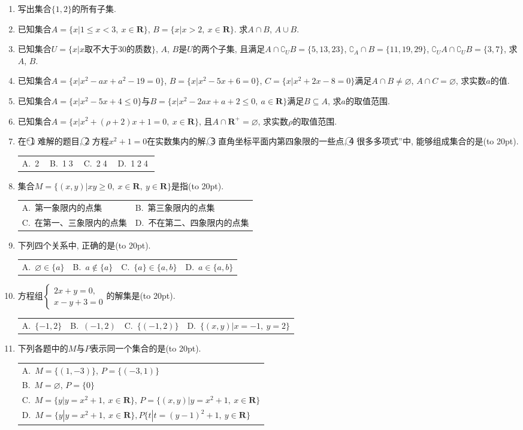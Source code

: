 \documentclass[10pt,a4paper]{article}
\newcommand{\bracket}[1]{(\hbox to #1pt{})}
\newcommand{\onech}[4]{\par\begin{tabular}{p{.9\textwidth}}
A.~#1\\
B.~#2\\
C.~#3\\
D.~#4
\end{tabular}}
\newcommand{\twoch}[4]{\par\begin{tabular}{p{.46\textwidth}p{.46\textwidth}}
A.~#1& B.~#2\\
C.~#3& D.~#4
\end{tabular}}
\newcommand{\fourch}[4]{\par\begin{tabular}{p{.23\textwidth}p{.23\textwidth}p{.23\textwidth}p{.23\textwidth}}
A.~#1 &B.~#2& C.~#3& D.~#4
\end{tabular}}
\begin{document}
\begin{enumerate}[1.]

\item 写出集合$\{1,2\}$的所有子集.
\item 已知集合$A=\{x|1 \le x<3,\ x\in \mathbf{R}\}$, $B=\{x|x>2,\ x\in \mathbf{R}\}$. 求$A\cap B$, $A\cup B$.
\item 已知集合$U =\{x|x\text{取不大于}30\text{的质数}\}$, $A$, $B$是$U$的两个子集, 且满足$A\cap \complement_UB=\{5,13,23\}$, $\complement_A\cap B=\{11,19,29\}$, $\complement_UA\cap \complement_UB=\{3,7\}$, 求$A$, $B$.
\item 已知集合$A=\{x|x^2- ax+a^2-19=0\}$, $B=\{x|x^2-5x+6=0\}$, $C=\{ x|x^2+2x-8=0\}$满足$A\cap B\ne \varnothing$, $A\cap C=\varnothing$, 求实数$a$的值.
\item 已知集合$A=\{x|x^2-5x+4\le 0\}$与$B=\{x|x^2-2ax+a+2\le 0,\ a\in \mathbf{R}\}$满足$B\subseteq A$, 求$a$的取值范围.
\item 已知集合$A=\{x|x^2 +(\rho +2)x+1=0, \ x\in \mathbf{R}\}$, 且$A\cap \mathbf{R}^+=\varnothing$, 求实数$\rho$的取值范围.
\item 在``\textcircled{1} 难解的题目, \textcircled{2} 方程$x^2+1=0$在实数集内的解, \textcircled{3} 直角坐标平面内第四象限的一些点, \textcircled{4} 很多多项式''中, 能够组成集合的是\bracket{20}.
\fourch{\textcircled{2}}{\textcircled{1}\textcircled{3}}{\textcircled{2}\textcircled{4}}{\textcircled{1}\textcircled{2}\textcircled{4}}
\item 集合$M=\{(x,y)|xy\ge 0,\ x\in \mathbf{R},\ y\in \mathbf{R}\}$是指\bracket{20}.
\twoch{第一象限内的点集}{第三象限内的点集}{在第一、三象限内的点集}{不在第二、四象限内的点集}
\item 下列四个关系中, 正确的是\bracket{20}.
\fourch{$\varnothing \in \{a\}$}{$a\notin \{a\}$}{$\{a\}\in \{a,b\}$}{$a\in \{a,b\}$}
\item 方程组$\begin{cases} 2x+y=0, \\ x-y+3=0 \end{cases}$的解集是\bracket{20}.
\fourch{$\{-1,2\}$}{$(-1,2)$}{$\{(-1,2)\}$}{$\{(x,y)|x=-1, \ y=2\}$}
\item 下列各题中的$M$与$P$表示同一个集合的是\bracket{20}.
\onech{$M=\{(1,-3)\}$, $P=\{(-3,1)\}$}{$M=\varnothing$, $P=\{0\}$}{$M=\{y|y=x^2+1, \ x\in \mathbf{R}\}$, $P=\{(x,y)|y=x^2+1, \ x\in \mathbf{R}\}$}{$M=\{y|y=x^2+1,\ x\in \mathbf{R}\},P\{t|t=(y-1)^2+1, \ y\in \mathbf{R}\}$}
\end{enumerate}
\end{document}

